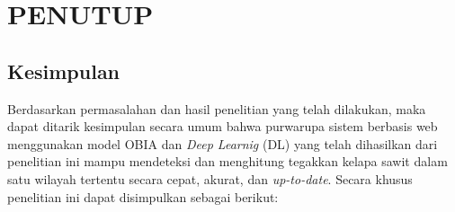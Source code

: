 \chapter{PENUTUP}
\section{Kesimpulan}
\hspace{1,2cm}
Berdasarkan permasalahan dan hasil penelitian yang telah dilakukan, maka dapat ditarik kesimpulan secara umum bahwa purwarupa sistem berbasis web menggunakan model OBIA dan \textit{Deep Learnig} (DL) yang telah dihasilkan dari penelitian ini mampu mendeteksi dan menghitung tegakkan kelapa sawit dalam satu wilayah tertentu secara cepat, akurat, dan \textit{up-to-date}. Secara khusus penelitian ini dapat disimpulkan sebagai berikut:

